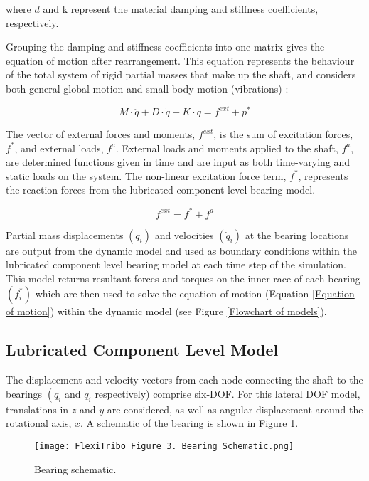 where $d$ and $\mathrm{k}$ represent the material damping and stiffness coefficients, respectively.

Grouping the damping and stiffness coefficients into one matrix gives the equation of motion after rearrangement. This equation represents the behaviour of the total system of rigid partial masses that make up the shaft, and considers both general global motion and small body motion (vibrations) \cite{Offner2011}:

\begin{equation}\label{Equation of motion}
	M \cdot \ddot{q}+D \cdot \dot{q}+K \cdot q=f^{e x t}+p^*
\end{equation}

The vector of external forces and moments, $f^{e x t}$, is the sum of excitation forces, $f^*$, and external loads, $f^a$. External loads and moments applied to the shaft, $f^a$, are determined functions given in time and are input as both time-varying and static loads on the system. The non-linear excitation force term, $f^*$, represents the reaction forces from the lubricated component level bearing model.

\begin{equation}\label{External forces}
	f^{e x t}=f^*+f^a
\end{equation}

Partial mass displacements $\left(q_i\right)$ and velocities $\left(\dot{q}_i\right)$ at the bearing locations are output from the dynamic model and used as boundary conditions within the lubricated component level bearing model at each time step of the simulation. This model returns resultant forces and torques on the inner race of each bearing $\left(f_i^*\right)$ which are then used to solve the equation of motion (Equation \ref{Equation of motion}) within the dynamic model (see Figure \ref{Flowchart of models}).

\subsection{Lubricated Component Level Model} \label{Contact mechanics FMBD}
The displacement and velocity vectors from each node connecting the shaft to the bearings $\left(q_i\right.$ and $\dot{q}_i$ respectively) comprise six-DOF. For this lateral DOF model, translations in $z$ and $y$ are considered, as well as angular displacement around the rotational axis, $x$. A schematic of the bearing is shown in Figure \ref{Bearing schematic}.

\begin{figure}
	\centering  
	\texttt{[image: FlexiTribo Figure 3. Bearing Schematic.png]}
	\caption{Bearing schematic.}
	\label{Bearing schematic}
\end{figure} 

